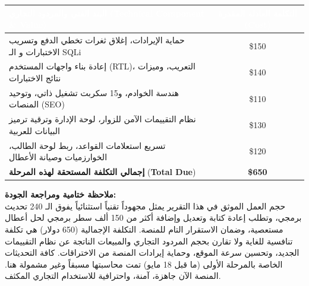 \documentclass[11pt,a4paper]{article}
\begin{document}
\vspace{0.5cm}
\begin{center}
\renewcommand{\arraystretch}{1.5}
\begin{tabularx}{0.95\textwidth}{|X|c|}
\hline
\rowcolor{darkblue} 
\textcolor{white}{\textbf{\textarabic{البند الفني والمردود التجاري}}} \textcolor{white}{\textbf{(\textenglish{Technical Component \& Value})}} & \textcolor{white}{\textbf{\textarabic{التكلفة العادلة المقدرة}}} \textcolor{white}{\textbf{(\textenglish{Cost})}} \\
\hline
\rowcolor{lightblue} 
\textarabic{حماية الإيرادات، إغلاق ثغرات تخطي الدفع وتسريب الاختبارات و الـ} \textenglish{SQLi} & \$150 \\
\hline
\textarabic{إعادة بناء واجهات المستخدم (RTL)، التعريب، وميزات نتائج الاختبارات} & \$140 \\
\hline
\rowcolor{lightblue} 
\textarabic{هندسة الخوادم، و15 سكربت تشغيل ذاتي، وتوحيد المنصات} (\textenglish{SEO}) & \$110 \\
\hline
\textarabic{نظام التقييمات الآمن للزوار، لوحة الإدارة وترقية ترميز البيانات للعربية} & \$130 \\
\hline
\rowcolor{lightblue} 
\textarabic{تسريع استعلامات القواعد، ربط لوحة الطالب، الخوارزميات وصيانة الأعطال} & \$120 \\
\hline
\rowcolor{arabicframe} 
\textbf{\textarabic{إجمالي التكلفة المستحقة لهذه المرحلة}} (\textbf{\textenglish{Total Due}}) & \textbf{\$650} \\
\hline
\end{tabularx}
\end{center}
\vspace{0.5cm}

\begin{arabicbox}
\textbf{\textarabic{ملاحظة ختامية ومراجعة الجودة:}}\\
\textarabic{
حجم العمل الموثق في هذا التقرير يمثل مجهوداً تقنياً استثنائياً يفوق الـ 240 تحديث برمجي، وتطلب إعادة كتابة وتعديل وإضافة أكثر من 150 ألف سطر برمجي لحل أعطال مستعصية، وضمان الاستقرار التام للمنصة. التكلفة الإجمالية (650 دولار) هي تكلفة تنافسية للغاية ولا تقارن بحجم المردود التجاري والمبيعات الناتجة عن نظام التقييمات الجديد، وتحسين سرعة الموقع، وحماية إيرادات المنصة من الاختراقات. كافة التحديثات الخاصة بالمرحلة الأولى (ما قبل 18 مايو) تمت محاسبتها مسبقاً وغير مشمولة هنا. المنصة الآن جاهزة، آمنة، واحترافية للاستخدام التجاري المكثف.
}
\end{arabicbox}
\end{document}
